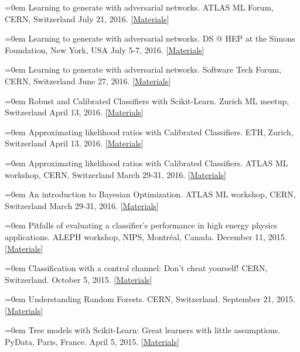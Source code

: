 \documentclass{scrartcl}
\newcommand{\MarginText}[1]{\marginpar{\raggedleft\itshape\small#1}}
\newcommand{\NewPublication}[4]{\noindent\hangindent=0em\hangafter=0 \MarginText{\color{black} #1}{\footnotesize [{\color{Maroon}#2}]} #3 {\footnotesize\color{gray}#4}\vspace{0.5em}}
\begin{document}
\begin{cv}{}
\NewPublication{}{24}{Learning to generate with adversarial networks.}{%
ATLAS ML Forum, CERN, Switzerland
July 21, 2016.
[\href{https://indico.cern.ch/event/556591/}{Materials}]}

\NewPublication{}{23}{Learning to generate with adversarial networks.}{%
DS @ HEP at the Simons Foundation, New York, USA
July 5-7, 2016.
[\href{https://indico.hep.caltech.edu/indico/conferenceTimeTable.py?confId=102}{Materials}]}

\NewPublication{}{22}{Learning to generate with adversarial networks.}{%
Software Tech Forum, CERN, Switzerland
June 27, 2016.
[\href{https://indico.cern.ch/event/544644/contributions/2210328/attachments/1299201/1938586/slides.pdf}{Materials}]}

\NewPublication{}{21}{Robust and Calibrated Classifiers with Scikit-Learn.}{%
Zurich ML meetup, Switzerland
April 13, 2016.
[\href{https://github.com/glouppe/tutorials-scikit-learn}{Materials}]}

\NewPublication{}{20}{Approximating likelihood ratios with Calibrated Classifiers.}{%
ETH, Zurich, Switzerland
April 13, 2016.
[\href{https://github.com/glouppe/talk-approximating-likelihood-ratios-with-classifiers}{Materials}]}

\NewPublication{}{19}{Approximating likelihood ratios with Calibrated Classifiers.}{%
ATLAS ML workshop, CERN, Switzerland
March 29-31, 2016.
[\href{https://github.com/glouppe/talk-approximating-likelihood-ratios-with-classifiers}{Materials}]}

\NewPublication{}{18}{An introduction to Bayesian Optimization.}{%
ATLAS ML workshop, CERN, Switzerland
March 29-31, 2016.
[\href{https://github.com/glouppe/talk-bayesian-optimisation}{Materials}]}

\NewPublication{}{17}{Pitfalls of evaluating a classifier’s performance in high energy physics applications.}{%
ALEPH workshop, NIPS, Montr\'eal, Canada.
December 11, 2015.
[\href{https://github.com/glouppe/talk-aleph-workshop2015}{Materials}]}

\NewPublication{}{16}{Classification with a control channel: Don't cheat yourself!}{%
CERN, Switzerland.
October 5, 2015.
[\href{https://github.com/glouppe/talk-classification-control-channel}{Materials}]}

\NewPublication{}{15}{Understanding Random Forests.}{%
CERN, Switzerland.
September 21, 2015.
[\href{https://github.com/glouppe/talk-pydata2015}{Materials}]}

\NewPublication{}{14}{Tree models with Scikit-Learn: Great learners with little assumptions.}{%
PyData, Paris, France.
April 5, 2015.
[\href{https://github.com/glouppe/talk-pydata2015}{Materials}]}


\end{cv}
\end{document}
